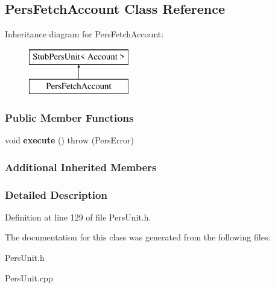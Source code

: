 \hypertarget{classPersFetchAccount}{\subsection{Pers\-Fetch\-Account Class Reference}
\label{df/d2b/classPersFetchAccount}
}
Inheritance diagram for Pers\-Fetch\-Account\-:\begin{figure}[H]
\begin{center}
\leavevmode
\includegraphics[height=2.000000cm]{df/d2b/classPersFetchAccount}
\end{center}
\end{figure}
\subsubsection*{Public Member Functions}
\begin{DoxyCompactItemize}
\item 
\hypertarget{classPersFetchAccount_a8fb6e7e8a65bebe14be61fb1a3c7f471}{void {\bfseries execute} ()  throw (\-Pers\-Error)}\label{df/d2b/classPersFetchAccount_a8fb6e7e8a65bebe14be61fb1a3c7f471}

\end{DoxyCompactItemize}
\subsubsection*{Additional Inherited Members}


\subsubsection{Detailed Description}


Definition at line 129 of file Pers\-Unit.\-h.



The documentation for this class was generated from the following files\-:\begin{DoxyCompactItemize}
\item 
Pers\-Unit.\-h\item 
Pers\-Unit.\-cpp\end{DoxyCompactItemize}

